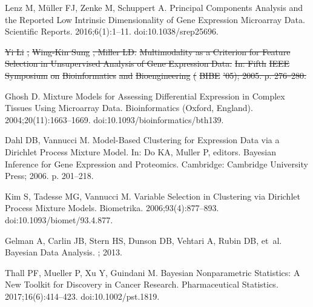 \documentclass[10pt,letterpaper]{article}
\providecommand{\DIFdeltex}[1]{{\protect\color{red}\sout{#1}}}                      %
\providecommand{\DIFdelbegin}{} %
\providecommand{\DIFdelend}{} %
\providecommand{\DIFdel}[1]{\texorpdfstring{\DIFdeltex{#1}}{}} %
\newcommand{\DIFscaledelfig}{0.5}
\newlength{\DIFdelgraphicswidth} %
\newlength{\DIFdelgraphicsheight} %
\newcommand{\DIFdelincludegraphics}[2][]{%
\sbox{\DIFdelgraphicsbox}{\DIFOincludegraphics[#1]{#2}}%
\settoboxwidth{\DIFdelgraphicswidth}{\DIFdelgraphicsbox} %
\settoboxtotalheight{\DIFdelgraphicsheight}{\DIFdelgraphicsbox} %
\scalebox{\DIFscaledelfig}{%
\parbox[b]{\DIFdelgraphicswidth}{\usebox{\DIFdelgraphicsbox}\\[-\baselineskip] \rule{\DIFdelgraphicswidth}{0em}}\llap{\resizebox{\DIFdelgraphicswidth}{\DIFdelgraphicsheight}{%
\setlength{\unitlength}{\DIFdelgraphicswidth}%
\begin{picture}(1,1)%
\thicklines\linethickness{2pt} %
{\color[rgb]{1,0,0}\put(0,0){\framebox(1,1){}}}%
{\color[rgb]{1,0,0}\put(0,0){\line( 1,1){1}}}%
{\color[rgb]{1,0,0}\put(0,1){\line(1,-1){1}}}%
\end{picture}%
}\hspace*{3pt}}} %
} %
\DeclareRobustCommand{\DIFdelbegin}{\DIFOdelbegin \let\includegraphics\DIFdelincludegraphics} %
\DeclareRobustCommand{\DIFdelend}{\DIFOaddend \let\includegraphics\DIFOincludegraphics} %
\begin{document}
\begin{thebibliography}{10}
	Lenz M, M{\"u}ller FJ, Zenke M, Schuppert A.
	\newblock Principal Components Analysis and the Reported Low Intrinsic
	Dimensionality of Gene Expression Microarray Data.
	\newblock Scientific Reports. 2016;6(1):1--11.
	\newblock doi:{10.1038/srep25696}.

	\DIFdelbegin %
\DIFdel{Yi Li}%
\DIFdel{, }%
\DIFdel{Wing-Kin Sung}%
\DIFdel{, Miller LD.
	}%
\DIFdel{Multimodality as a Criterion for Feature Selection in Unsupervised
	Analysis of Gene Expression Data.
	}%
\DIFdel{In: Fifth }%
\DIFdel{IEEE Symposium}%
\DIFdel{on }%
\DIFdel{Bioinformatics}%
\DIFdel{and
	}%
\DIFdel{Bioengineering}%
\DIFdel{(}%
\DIFdel{BIBE}%
\DIFdel{'05); 2005. p. 276--280.
	}%

\DIFdelend {}
	Ghosh D.
	\newblock Mixture Models for Assessing Differential Expression in Complex
	Tissues Using Microarray Data.
	\newblock Bioinformatics (Oxford, England). 2004;20(11):1663--1669.
	\newblock doi:{10.1093/bioinformatics/bth139}.

	Dahl DB, Vannucci M.
	\newblock Model-{{Based Clustering}} for {{Expression Data}} via a {{Dirichlet
			Process Mixture Model}}.
	\newblock In: Do KA, Muller P, editors. Bayesian {{Inference}} for {{Gene
			Expression}} and {{Proteomics}}. {Cambridge}: {Cambridge University Press};
	2006. p. 201--218.

	Kim S, Tadesse MG, Vannucci M.
	\newblock Variable Selection in Clustering via {{Dirichlet}} Process Mixture
	Models.
	\newblock Biometrika. 2006;93(4):877--893.
	\newblock doi:{10.1093/biomet/93.4.877}.

	Gelman A, Carlin JB, Stern HS, Dunson DB, Vehtari A, Rubin DB, et~al.
	\newblock Bayesian {{Data Analysis}}.
	; 2013.

	Thall PF, Mueller P, Xu Y, Guindani M.
	\newblock Bayesian Nonparametric Statistics: {{A}} New Toolkit for Discovery in
	Cancer Research.
	\newblock Pharmaceutical Statistics. 2017;16(6):414--423.
	\newblock doi:{10.1002/pst.1819}.


\end{thebibliography}
\end{document}
